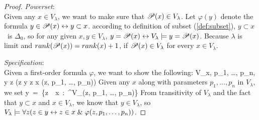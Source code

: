 \begin{proof}
\item \emph{Powerset}: \\
Given any $x \in V_\lambda$, we want to make sure that $\mathscr{P} (x) \in V_\lambda$. Let $\varphi(y)$ denote the formula $y \in \mathscr{P} (x) \leftrightarrow y \subset x$.
according to definition of subset (\ref{def:subset}), $y \subset x$ is $\Delta_0$, so for any given $x, y \in V_\lambda$, $y = \mathscr{P} (x) \leftrightarrow V_\lambda \models y = \mathscr{P} (x)$.
Because $\lambda$ is limit and $rank(\mathscr{P} (x)) = rank(x)+1$, if $\mathscr{P} (x) \in V_\lambda$ for every $x \in V_\lambda$.

\item \emph{Specification}: \\ %
Given a first-order formula $\varphi$, we want to show the following:
\beq
V_\lambda \models \forall x, p_1, \ldots, p_n, \exists y \forall z (z \in y \iff z \in x \et \varphi(z, p_1, \ldots, p_n))
\eeq
Given any $x$ along with parameters $p_1, \ldots, p_n$ in $V_\lambda$, we set
\beq
y~=~\{z~\in~x~:~\varphi^{V_\lambda}(z, p_1, \ldots, p_n)\}
\eeq
From transitivity of $V_\lambda$ and the fact that $y \subset x$ and $x \in V_\lambda$, we know that $y \in V_\lambda$, 
so $V_\lambda \models \forall z (z \in y \leftrightarrow z \in x \mathrel{\&} \varphi(z, p_1, \dots, p_n))$.
\ece
\end{proof}




